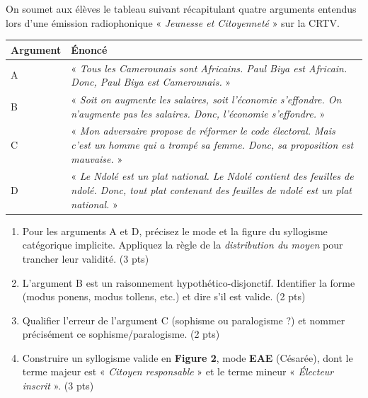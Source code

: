 \documentclass[11pt]{article}
\begin{document}
\begin{exercice}
On soumet aux élèves le tableau suivant récapitulant quatre arguments entendus lors d'une émission radiophonique « \textit{Jeunesse et Citoyenneté} » sur la CRTV.
\begin{center}
\begin{tabularx}{\linewidth}{@{}lX@{}}
\toprule
\textbf{Argument} & \textbf{Énoncé} \\
\midrule
A & « \textit{Tous les Camerounais sont Africains. Paul Biya est Africain. Donc, Paul Biya est Camerounais.} » \\
B & « \textit{Soit on augmente les salaires, soit l'économie s'effondre. On n'augmente pas les salaires. Donc, l'économie s'effondre.} » \\
C & « \textit{Mon adversaire propose de réformer le code électoral. Mais c'est un homme qui a trompé sa femme. Donc, sa proposition est mauvaise.} » \\
D & « \textit{Le Ndolé est un plat national. Le Ndolé contient des feuilles de ndolé. Donc, tout plat contenant des feuilles de ndolé est un plat national.} » \\
\bottomrule
\end{tabularx}
\end{center}
\begin{enumerate}
    \item Pour les arguments A et D, précisez le mode et la figure du syllogisme catégorique implicite. Appliquez la règle de la \textit{distribution du moyen} pour trancher leur validité. (3 pts)
    \item L'argument B est un raisonnement hypothético-disjonctif. Identifier la forme (modus ponens, modus tollens, etc.) et dire s'il est valide. (2 pts)
    \item Qualifier l'erreur de l'argument C (sophisme ou paralogisme ?) et nommer précisément ce sophisme/paralogisme. (2 pts)
    \item Construire un syllogisme valide en \textbf{Figure 2}, mode \textbf{EAE} (Césarée), dont le terme majeur est « \textit{Citoyen responsable} » et le terme mineur « \textit{Électeur inscrit} ». (3 pts)
\end{enumerate}
\end{exercice}
\end{document}
